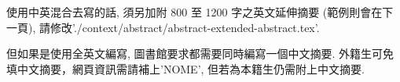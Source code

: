 \StartChiAbstract

使用中英混合去寫的話, 須另加附 800 至 1200 字之英文延伸摘要 (範例則會在下一頁), 請修改'./context/abstract/abstract-extended-abstract.tex'.

但如果是使用全英文編寫, 圖書館要求都需要同時編寫一個中文摘要. 外籍生可免填中文摘要，網頁資訊需請補上'NOME', 但若為本籍生仍需附上中文摘要.

\EndChiAbstract
